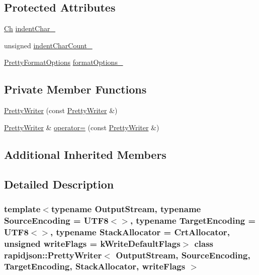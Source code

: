\subsection*{Protected Attributes}
\begin{DoxyCompactItemize}
\item 
\mbox{\hyperlink{classrapidjson_1_1_pretty_writer_a74a38902073aa599c8bcc6a3ca6126d0}{Ch}} \mbox{\hyperlink{classrapidjson_1_1_pretty_writer_ad5492530262115dee2b44fc7682ddc07}{indent\+Char\+\_\+}}
\item 
unsigned \mbox{\hyperlink{classrapidjson_1_1_pretty_writer_a8b4afa26067dcc84e3940bdde08e59f1}{indent\+Char\+Count\+\_\+}}
\item 
\mbox{\hyperlink{namespacerapidjson_a084b31753ef2edefdeca8a5374eccc4b}{Pretty\+Format\+Options}} \mbox{\hyperlink{classrapidjson_1_1_pretty_writer_a27c46a2b1fd7a0c1cb518ba9c0f998cf}{format\+Options\+\_\+}}
\end{DoxyCompactItemize}
\subsection*{Private Member Functions}
\begin{DoxyCompactItemize}
\item 
\mbox{\hyperlink{classrapidjson_1_1_pretty_writer_a446ed5e4236460e172e85edca73ffce5}{Pretty\+Writer}} (const \mbox{\hyperlink{classrapidjson_1_1_pretty_writer}{Pretty\+Writer}} \&)
\item 
\mbox{\hyperlink{classrapidjson_1_1_pretty_writer}{Pretty\+Writer}} \& \mbox{\hyperlink{classrapidjson_1_1_pretty_writer_a7bddd65e00443bdcecb4eff722dd0728}{operator=}} (const \mbox{\hyperlink{classrapidjson_1_1_pretty_writer}{Pretty\+Writer}} \&)
\end{DoxyCompactItemize}
\subsection*{Additional Inherited Members}


\subsection{Detailed Description}
\subsubsection*{template$<$typename Output\+Stream, typename Source\+Encoding = U\+T\+F8$<$$>$, typename Target\+Encoding = U\+T\+F8$<$$>$, typename Stack\+Allocator = Crt\+Allocator, unsigned write\+Flags = k\+Write\+Default\+Flags$>$\newline
class rapidjson\+::\+Pretty\+Writer$<$ Output\+Stream, Source\+Encoding, Target\+Encoding, Stack\+Allocator, write\+Flags $>$}

